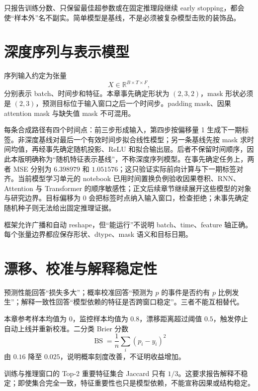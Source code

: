 \begin{diagnostic}
只报告训练分数、只保留最佳超参数或在固定推理段继续 early stopping，都会使“样本外”名不副实。简单模型是基线，不是必须被复杂模型击败的装饰品。
\end{diagnostic}

\section{深度序列与表示模型}

序列输入约定为张量
\[
X\in\mathbb R^{B\times T\times F},
\]
分别表示 batch、时间步和特征。本章事先确定形状为 $(2,3,2)$，mask 形状必须是 $(2,3)$，预测目标位于输入窗口之后一个时间步。padding mask、因果 attention mask 与缺失值 mask 不可混用。

每条合成路径有四个时间点：前三步形成输入，第四步按偏移量 1 生成下一期标签。非深度基线对最后一个有效时间步拟合线性模型；另一条基线先按 mask 求时间均值，再经事先确定随机投影、ReLU 和拟合输出层。后者不保留时间顺序，因此本版明确称为“随机特征表示基线”，不称深度序列模型。在事先确定任务上，两者 MSE 分别为 $6.398979$ 和 $1.051576$；这只验证实际前向计算与下一期标签对齐。当前模型学习单元的 notebook 已用时间置换负例验收因果卷积、RNN、Attention 与 Transformer 的顺序敏感性；正文后续章节继续展开这些模型的对象与研究边界。目标偏移为 0 会把标签时点纳入输入窗口，检查拒绝；未事先确定随机种子则无法给出固定推理证据。

\begin{note}[Python 边界]
框架允许广播和自动 reshape，但“能运行”不说明 batch、time、feature 轴正确。每个张量边界都应保存形状、dtype、mask 语义和目标日期。
\end{note}

\section{漂移、校准与解释稳定性}

预测性能回答“损失多大”；概率校准回答“预测为 $p$ 的事件是否约有 $p$ 比例发生”；解释一致性回答“模型依赖的特征是否跨窗口稳定”。三者不能互相替代。

本章参考样本均值为 0，监控样本均值为 $0.8$，漂移距离超过阈值 $0.5$，触发停止自动上线并重新校准。二分类 Brier 分数
\[
\operatorname{BS}=\frac1n\sum_i(p_i-y_i)^2
\]
由 $0.16$ 降至 $0.025$，说明概率刻度改善，不证明收益增加。

训练与推理窗口的 Top-2 重要特征集合 Jaccard 只有 $1/3$。这要求报告解释不稳定；即使集合完全一致，特征重要性也只是模型依赖，不能宣称因果或结构稳定。

